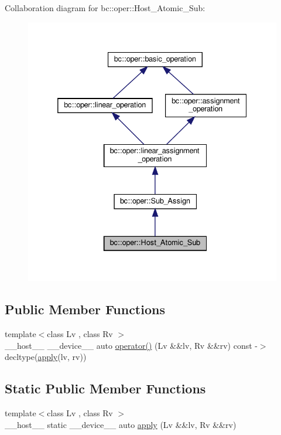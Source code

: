 Collaboration diagram for bc\+:\+:oper\+:\+:Host\+\_\+\+Atomic\+\_\+\+Sub\+:\nopagebreak
\begin{figure}[H]
\begin{center}
\leavevmode
\includegraphics[width=332pt]{structbc_1_1oper_1_1Host__Atomic__Sub__coll__graph}
\end{center}
\end{figure}
\subsection*{Public Member Functions}
\begin{DoxyCompactItemize}
\item 
{\footnotesize template$<$class Lv , class Rv $>$ }\\\+\_\+\+\_\+host\+\_\+\+\_\+ \+\_\+\+\_\+device\+\_\+\+\_\+ auto \hyperlink{structbc_1_1oper_1_1Host__Atomic__Sub_aab139f096f99c175ba23dc05024dc35f}{operator()} (Lv \&\&lv, Rv \&\&rv) const -\/$>$ decltype(\hyperlink{structbc_1_1oper_1_1Host__Atomic__Sub_aed14d14ed0dbcbdda4a64147cc3d1409}{apply}(lv, rv))
\end{DoxyCompactItemize}
\subsection*{Static Public Member Functions}
\begin{DoxyCompactItemize}
\item 
{\footnotesize template$<$class Lv , class Rv $>$ }\\\+\_\+\+\_\+host\+\_\+\+\_\+ static \+\_\+\+\_\+device\+\_\+\+\_\+ auto \hyperlink{structbc_1_1oper_1_1Host__Atomic__Sub_aed14d14ed0dbcbdda4a64147cc3d1409}{apply} (Lv \&\&lv, Rv \&\&rv)
\end{DoxyCompactItemize}
